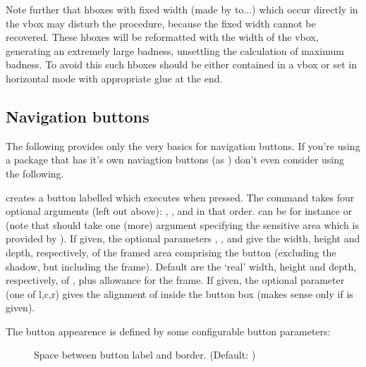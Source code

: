 \begin{slide}
  \newslide

  Note further that hboxes with fixed width
  (made by  to...) which occur directly in the vbox may disturb
  the procedure, because the fixed width cannot be recovered. These hboxes will
  be reformatted with the width of the vbox, generating an extremely large
  badness, unsettling the calculation of maximum badness. To avoid this such
  hboxes should be either contained in a vbox or set in horizontal mode with
  appropriate glue at the end.

  \newslide

  \subsection{Navigation buttons}
  The following provides only the very basics for navigation buttons. If you're
  using a package that has it's own naviagtion buttons (as
  \href{ftp://ftp.dante.de/tex-archive/help/Catalogue/entries/pdfscreen.html}%
  {}) don't even consider using the following.

  creates a button labelled  which executes  when
  pressed. The command takes four optional arguments (left out above):
  , ,  and  in that order.
   can be for instance  or
   (note that  should take
  one (more) argument specifying the sensitive area which is provided by
  ).  If given, the optional parameters , , and
   give the width, height and depth, respectively, of the framed
  area comprising the button (excluding the shadow, but including the
  frame). Default are the `real' width, height and depth, respectively, of
  , plus allowance for the frame.  If given, the optional parameter
   (one of l,c,r) gives the alignment of  inside the
  button box (makes sense only if  is given).

  The button appearence is defined by some configurable button parameters:
  \begin{description}
  \item[]
    Space between button label and border. (Default: )


\end{description}
\end{slide}
